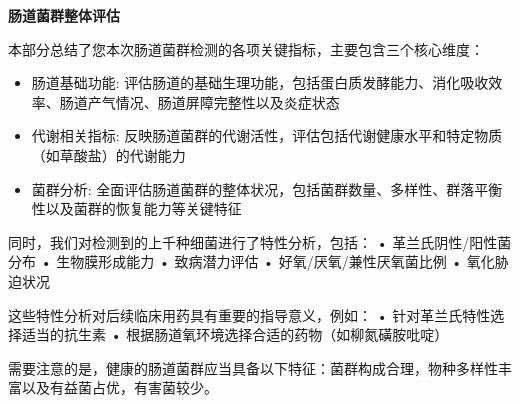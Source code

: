 \documentclass[UTF8]{ctexart}
\begin{document}
\newpage

\begin{tcolorbox}[
    enhanced,
    colback=white,
    colframe=customTeal,
    arc=2mm,
    boxrule=1pt,
    left=20pt,
    right=20pt,
    top=12pt,
    bottom=12pt,
    width=\textwidth,
    fontupper=\sffamily,
    overlay={
    \draw[customTeal, line width=2pt]
    ([xshift=15pt]frame.south west) -- ([xshift=-15pt]frame.south east);
    }
]
{\Large\bfseries\textcolor{customTeal}{\Huge 肠道菌群整体评估}}
\end{tcolorbox}

\begin{tcolorbox}[
    enhanced,
    colback=customTealBg,
    colframe=gray!5,
    arc=3mm,
    boxrule=0pt,
    width=\textwidth,
    top=8pt,
    bottom=8pt
]
{\footnotesize{\color{customTeal}
\faInfoCircle} 本部分总结了您本次肠道菌群检测的各项关键指标，主要包含三个核心维度：
\begin{itemize}
    \item 肠道基础功能: 评估肠道的基础生理功能，包括蛋白质发酵能力、消化吸收效率、肠道产气情况、肠道屏障完整性以及炎症状态

    \item 代谢相关指标: 反映肠道菌群的代谢活性，评估包括代谢健康水平和特定物质（如草酸盐）的代谢能力

    \item 菌群分析: 全面评估肠道菌群的整体状况，包括菌群数量、多样性、群落平衡性以及菌群的恢复能力等关键特征
\end{itemize}
同时，我们对检测到的上千种细菌进行了特性分析，包括：
• 革兰氏阴性/阳性菌分布
• 生物膜形成能力
• 致病潜力评估
• 好氧/厌氧/兼性厌氧菌比例
• 氧化胁迫状况

这些特性分析对后续临床用药具有重要的指导意义，例如：
• 针对革兰氏特性选择适当的抗生素
• 根据肠道氧环境选择合适的药物（如柳氮磺胺吡啶）

需要注意的是，健康的肠道菌群应当具备以下特征：菌群构成合理，物种多样性丰富以及有益菌占优，有害菌较少。
}
\end{tcolorbox}

\end{document}
